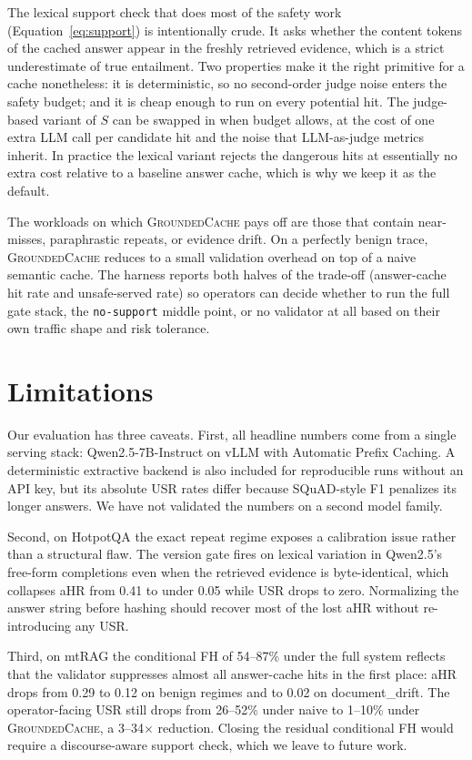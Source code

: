 \documentclass[11pt]{article}
\newcommand{\sys}{\textsc{GroundedCache}\xspace}
\begin{document}
The lexical support check that does most of the safety work
(Equation~\ref{eq:support}) is intentionally crude. It asks whether
the content tokens of the cached answer appear in the freshly
retrieved evidence, which is a strict underestimate of true
entailment. Two properties make it the right primitive for a cache
nonetheless: it is deterministic, so no second-order judge noise
enters the safety budget; and it is cheap enough to run on every
potential hit. The judge-based variant of $S$ can be swapped in
when budget allows, at the cost of one extra LLM call per candidate
hit and the noise that LLM-as-judge metrics inherit. In practice
the lexical variant rejects the dangerous hits at essentially no
extra cost relative to a baseline answer cache, which is why we keep
it as the default.

The workloads on which \sys{} pays off are those that contain
near-misses, paraphrastic repeats, or evidence drift. On a perfectly
benign trace, \sys{} reduces to a small validation overhead on top
of a naive semantic cache. The harness reports both halves of the
trade-off (answer-cache hit rate and unsafe-served rate) so
operators can decide whether to run the full gate stack, the
\texttt{no-support} middle point, or no validator at all based on
their own traffic shape and risk tolerance.

\FloatBarrier
\section{Limitations}
Our evaluation has three caveats. First, all headline numbers come from
a single serving stack: Qwen2.5-7B-Instruct on vLLM with Automatic
Prefix Caching. A deterministic extractive backend is also included
for reproducible runs without an API key, but its absolute USR rates
differ because SQuAD-style F1 penalizes its longer answers. We have
not validated the numbers on a second model family.

Second, on HotpotQA the exact repeat regime exposes a calibration
issue rather than a structural flaw. The version gate fires on
lexical variation in Qwen2.5's free-form completions even when the
retrieved evidence is byte-identical, which collapses aHR from 0.41
to under 0.05 while USR drops to zero. Normalizing the answer string
before hashing should recover most of the lost aHR without
re-introducing any USR.

Third, on mtRAG the conditional FH of 54--87\% under the full system
reflects that the validator suppresses almost all answer-cache hits
in the first place: aHR drops from 0.29 to 0.12 on benign regimes and
to 0.02 on document\_drift. The operator-facing USR still drops from
26--52\% under naive to 1--10\% under \sys{}, a 3--34$\times$
reduction. Closing the residual conditional FH would require a
discourse-aware support check, which we leave to future work.
\end{document}
